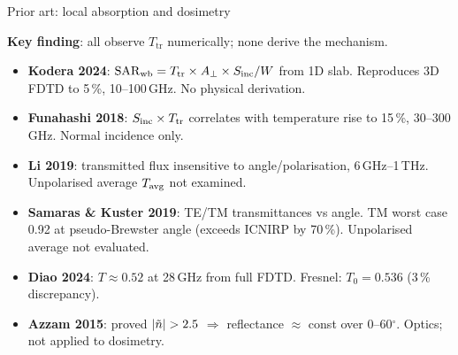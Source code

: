 \begin{frame}[label=app-lit-dosimetry]{Prior art: local absorption and dosimetry}

  \textbf{Key finding}: all observe $T_{\mathrm{tr}}$ numerically; none derive the mechanism.

  \vspace{6pt}
  {\small
  \begin{itemize}
    \item \textbf{Kodera 2024}: $\mathrm{SAR}_{\mathrm{wb}} = T_{\mathrm{tr}} \times A_{\perp} \times S_{\mathrm{inc}}/W$ from 1D slab. Reproduces 3D FDTD to 5\,\%, 10--100\,GHz. No physical derivation.
    \item \textbf{Funahashi 2018}: $S_{\mathrm{inc}} \times T_{\mathrm{tr}}$ correlates with temperature rise to 15\,\%, 30--300\,GHz. Normal incidence only.
    \item \textbf{Li 2019}: transmitted flux insensitive to angle/polarisation, 6\,GHz--1\,THz. Unpolarised average $T_{\mathrm{avg}}$ not examined.
    \item \textbf{Samaras \& Kuster 2019}: TE/TM transmittances vs angle. TM worst case 0.92 at pseudo-Brewster angle (exceeds ICNIRP by 70\,\%). Unpolarised average not evaluated.
    \item \textbf{Diao 2024}: $T \approx 0.52$ at 28\,GHz from full FDTD. Fresnel: $T_0 = 0.536$ (3\,\% discrepancy).
    \item \textbf{Azzam 2015}: proved $|\tilde{n}| > 2.5$ $\Rightarrow$ reflectance $\approx$ const over 0--60$^\circ$. Optics; not applied to dosimetry.
  \end{itemize}
  }

  \vspace{4pt}
\end{frame}

